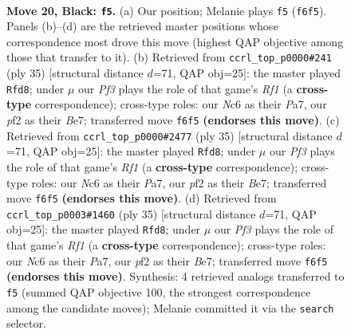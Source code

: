 \documentclass[11pt]{article}
\begin{document}
\clearpage

\begin{figure}[p]\centering
\begin{subfigure}{0.46\textwidth}\centering
\resizebox{\linewidth}{!}{%
\newchessgame
\chessboard[
  setfen={r4r1b/1ppb1k2/p1n2pp1/4p2p/2P1P3/2N2N2/PPB1KPP1/R1B3R1 b - - 3 20},
  showmover=false,
  pgfstyle=straightmove, color=movearrow, markmove={f6-f5}
]}
\caption{}
\end{subfigure}\hfill
\begin{subfigure}{0.46\textwidth}\centering
\resizebox{\linewidth}{!}{%
\newchessgame
\chessboard[
  setfen={r4rk1/pp2bpp1/2p1pn1p/7P/2PP4/3RBN2/PP3PP1/1K5R b - - 0 18},
  showmover=false,
  pgfstyle=straightmove, color=movearrow, markmove={f8-d8}
]}
\caption{}
\end{subfigure}
\\[4pt]
\begin{subfigure}{0.46\textwidth}\centering
\resizebox{\linewidth}{!}{%
\newchessgame
\chessboard[
  setfen={r4rk1/pp2bpp1/2p1pn1p/7P/2PP4/3RBN2/PP3PP1/1K5R b - - 0 18},
  showmover=false,
  pgfstyle=straightmove, color=movearrow, markmove={f8-d8}
]}
\caption{}
\end{subfigure}\hfill
\begin{subfigure}{0.46\textwidth}\centering
\resizebox{\linewidth}{!}{%
\newchessgame
\chessboard[
  setfen={r4rk1/pp2bpp1/2p1pn1p/7P/2PP4/3RBN2/PP3PP1/1K5R b - - 0 18},
  showmover=false,
  pgfstyle=straightmove, color=movearrow, markmove={f8-d8}
]}
\caption{}
\end{subfigure}
\caption{\textbf{Move 20, Black: \texttt{f5}.} (a) Our position; Melanie plays \texttt{f5} (\texttt{f6f5}). Panels (b)--(d) are the retrieved master positions whose correspondence most drove this move (highest QAP objective among those that transfer to it). (b) Retrieved from \texttt{ccrl\_top\_p0000\#241} (ply 35) [structural distance $d$=71, QAP obj=25]: the master played \texttt{Rfd8}; under $\mu$ our \emph{Pf3} plays the role of that game's \emph{Rf1} (a \textbf{cross-type} correspondence); cross-type roles: our \emph{N}c6 as their \emph{P}a7, our \emph{p}f2 as their \emph{B}e7; transferred move \texttt{f6f5} \textbf{(endorses this move)}. (c) Retrieved from \texttt{ccrl\_top\_p0000\#2477} (ply 35) [structural distance $d$=71, QAP obj=25]: the master played \texttt{Rfd8}; under $\mu$ our \emph{Pf3} plays the role of that game's \emph{Rf1} (a \textbf{cross-type} correspondence); cross-type roles: our \emph{N}c6 as their \emph{P}a7, our \emph{p}f2 as their \emph{B}e7; transferred move \texttt{f6f5} \textbf{(endorses this move)}. (d) Retrieved from \texttt{ccrl\_top\_p0003\#1460} (ply 35) [structural distance $d$=71, QAP obj=25]: the master played \texttt{Rfd8}; under $\mu$ our \emph{Pf3} plays the role of that game's \emph{Rf1} (a \textbf{cross-type} correspondence); cross-type roles: our \emph{N}c6 as their \emph{P}a7, our \emph{p}f2 as their \emph{B}e7; transferred move \texttt{f6f5} \textbf{(endorses this move)}. Synthesis: 4 retrieved analogs transferred to \texttt{f5} (summed QAP objective 100, the strongest correspondence among the candidate moves); Melanie committed it via the \texttt{search} selector.}
\label{fig:thought-m39}
\end{figure}
\end{document}
